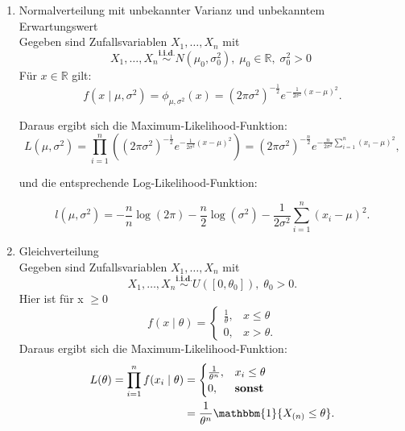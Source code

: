 \documentclass[10pt]{article}
\newcommand{\FZV}{X_1, \ldots, X_n} %
\newcommand{\IR}{\mathbb{R}} %
\newcommand{\xt}{x \mid \theta} %
\begin{document}
\begin{enumerate}[label = (\roman*)]
		
		\item Normalverteilung mit unbekannter Varianz und unbekanntem Erwartungswert\\
		Gegeben sind Zufallsvariablen $\FZV$ mit
		\begin{equation*}
			\FZV \overset{\textbf{i.i.d.}} {\sim} N(\mu_0,\sigma_0^2),\; \mu_0 \in \IR, \; \sigma_0^2 >0 \; 
		\end{equation*} 
		Für $x \in \IR$	gilt:
		\begin{equation*}
			f(x \mid \mu, \sigma^2) = \phi_{\mu,\sigma^2}(x)=(2\pi\sigma^2)^{-\frac{1}{2}}e^{-\frac{1}{2\sigma^2}(x-\mu)^2}.
		\end{equation*}
		
		Daraus ergibt sich die Maximum-Likelihood-Funktion:
		\begin{equation*}
			L(\mu, \sigma^2) = \prod_{i=1}^{n}((2\pi\sigma^2)^{-\frac{1}{2}}e^{-\frac{1}{2\sigma^2}(x-\mu)^2}) = (2\pi\sigma^2)^{-\frac{n}{2}}e^{-\frac{n}{2\sigma^2}\sum_{i=1}^{n}(x_i-\mu)^2},
		\end{equation*}
		
		und die entsprechende Log-Likelihood-Funktion:
		
		\begin{equation*}
			l(\mu, \sigma^2) = -\frac{n}{n}\log(2\pi) - \frac{n}{2}\log(\sigma^2)-\frac{1}{2\sigma^2}\sum_{i=1}^{n}(x_i-\mu)^2.
		\end{equation*}
		
		\item Gleichverteilung\\
		Gegeben sind Zufallsvariablen $\FZV$ mit
		\begin{equation*}
			\FZV \overset{\textbf{i.i.d.}}{\sim} U([0,\theta_0]), \; \theta_0 >0.
		\end{equation*}
		Hier ist für x $\geq 0$
		\begin{equation*}
			f(\xt)=\begin{cases}
				\frac{1}{\theta}, & x\leq \theta\\
				0, & x >\theta.
			\end{cases}
		\end{equation*}
		Daraus ergibt sich die Maximum-Likelihood-Funktion:
		\begin{equation*}
			\begin{split}
					L(\theta)=\prod_{i=1}^{n} f(x_i \mid \theta) &= \begin{cases}
					\frac{1}{\theta^n}, & x_i\leq \theta\\
					0, & \textbf{sonst}
				\end{cases}\\ &= \frac{1}{\theta^n} \mathbbm{1}\{X_{(n)} \leq \theta\}.
			\end{split}
		\end{equation*}
		
	\end{enumerate}
	
	
	
\end{document}
